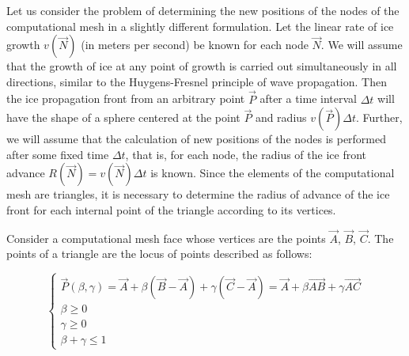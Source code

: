 \documentclass[
11pt,%
tightenlines,%
twoside,%
onecolumn,%
nofloats,%
nobibnotes,%
nofootinbib,%
superscriptaddress,%
noshowpacs,%
centertags]%
{revtex4-2}
\begin{document}
Let us consider the problem of determining the new positions of the nodes of the computational mesh in a slightly different formulation.
Let the linear rate of ice growth $v(\vec{N})$ (in meters per second) be known for each node $\vec{N}$.
We will assume that the growth of ice at any point of growth is carried out simultaneously in all directions, similar to the Huygens-Fresnel principle of wave propagation.
Then the ice propagation front from an arbitrary point $\vec{P}$ after a time interval $\Delta t$ will have the shape of a sphere centered at the point $\vec{P}$ and radius $v(\vec{P}) \Delta t$.
Further, we will assume that the calculation of new positions of the nodes is performed after some fixed time $\Delta t$, that is, for each node, the radius of the ice front advance $R(\vec{N}) = v(\vec{N}) \Delta t$ is known.
Since the elements of the computational mesh are triangles, it is necessary to determine the radius of advance of the ice front for each internal point of the triangle according to its vertices.

Consider a computational mesh face whose vertices are the points $\vec{A}$, $\vec{B}$, $\vec{C}$.
The points of a triangle are the locus of points described as follows:

\begin{equation}
\begin{cases}
\vec{P}(\beta, \gamma) = \vec{A} + \beta (\vec{B} - \vec{A}) + \gamma (\vec{C} - \vec{A}) = \vec{A} + \beta \vec{AB} + \gamma \vec{AC} \\
\beta \ge 0 \\
\gamma \ge 0 \\
\beta + \gamma \le 1
\end{cases}
\end{equation}
\end{document}
